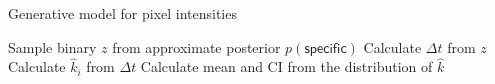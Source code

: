 \begin{algorithm}
\caption{Generative model for pixel intensities}
\begin{algorithmic}[1]
    \State Sample binary $z$ from approximate posterior $p(\mathsf{specific})$
    \State Calculate $\Delta t$ from $z$
    \State Calculate $\hat{k}_i$ from $\Delta t$
\EndFor{}
\State Calculate mean and CI from the distribution of $\hat{k}$
\end{algorithmic}
\end{algorithm}